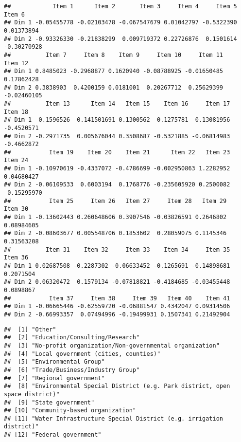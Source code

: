 \documentclass[
]{article}
\newenvironment{Shaded}{\begin{snugshade}}{\end{snugshade}}
\newcommand{\KeywordTok}[1]{\textcolor[rgb]{0.13,0.29,0.53}{\textbf{#1}}}
\newcommand{\NormalTok}[1]{#1}
\newcommand{\OperatorTok}[1]{\textcolor[rgb]{0.81,0.36,0.00}{\textbf{#1}}}
\newcommand{\StringTok}[1]{\textcolor[rgb]{0.31,0.60,0.02}{#1}}
\begin{document}
\begin{verbatim}
##            Item 1      Item 2       Item 3     Item 4     Item 5      Item 6
## Dim 1 -0.05455778 -0.02103478 -0.067547679 0.01042797 -0.5322390  0.01373894
## Dim 2 -0.93326330 -0.21838299  0.009719372 0.22726876  0.1501614 -0.30270928
##          Item 7     Item 8    Item 9     Item 10     Item 11     Item 12
## Dim 1 0.8485023 -0.2968877 0.1620940 -0.08788925 -0.01650485  0.17862428
## Dim 2 0.3838903  0.4200159 0.0181001  0.20267712  0.25629399 -0.02460105
##          Item 13      Item 14   Item 15    Item 16     Item 17    Item 18
## Dim 1  0.1596526 -0.141501691 0.1300562 -0.1275781 -0.13081956 -0.4520571
## Dim 2 -0.2971735  0.005676044 0.3508687 -0.5321885 -0.06814983 -0.4662872
##           Item 19    Item 20    Item 21      Item 22   Item 23     Item 24
## Dim 1 -0.10970619 -0.4337072 -0.4786699 -0.002950863 1.2282952  0.04680427
## Dim 2 -0.06109533  0.6003194  0.1768776 -0.235605920 0.2500082 -0.15295970
##           Item 25     Item 26   Item 27     Item 28   Item 29    Item 30
## Dim 1 -0.13602443 0.260648606 0.3907546 -0.03826591 0.2646802 0.08984605
## Dim 2 -0.08603677 0.005548706 0.1853602  0.28059075 0.1145346 0.31563208
##          Item 31    Item 32     Item 33    Item 34     Item 35   Item 36
## Dim 1 0.02687508 -0.2287302 -0.06633452 -0.1265691 -0.14898681 0.2071504
## Dim 2 0.06320472  0.1579134 -0.07818821 -0.4184685 -0.03455448 0.0898867
##           Item 37     Item 38     Item 39   Item 40    Item 41
## Dim 1 -0.06665446 -0.62559720 -0.06881547 0.4342047 0.09314506
## Dim 2 -0.66993357  0.07494996 -0.19499931 0.1507341 0.21492904
\end{verbatim}

\begin{Shaded}
\end{Shaded}

\begin{verbatim}
##  [1] "Other"                                                                   
##  [2] "Education/Consulting/Research"                                           
##  [3] "No-profit organization/Non-governmental organization"                    
##  [4] "Local government (cities, counties)"                                     
##  [5] "Environmental Group"                                                     
##  [6] "Trade/Business/Industry Group"                                           
##  [7] "Regional government"                                                     
##  [8] "Environmental Special District (e.g. Park district, open space district)"
##  [9] "State government"                                                        
## [10] "Community-based organization"                                            
## [11] "Water Infrastructure Special District (e.g. irrigation district)"        
## [12] "Federal government"
\end{verbatim}
\end{document}
